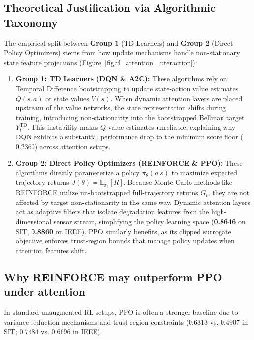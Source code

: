 \documentclass[sn-basic]{sn-jnl}%
\begin{document}
\subsection{Theoretical Justification via Algorithmic Taxonomy}
The empirical split between \textbf{Group 1} (TD Learners) and \textbf{Group 2} (Direct Policy Optimizers) stems from how update mechanisms handle non-stationary state feature projections (Figure~\ref{fig:rl_attention_interaction}):

\begin{enumerate}
	\item \textbf{Group 1: TD Learners (\textsc{DQN} \& \textsc{A2C}):} These algorithms rely on Temporal Difference bootstrapping to update state-action value estimates $Q(s,a)$ or state values $V(s)$. When dynamic attention layers are placed upstream of the value networks, the state representation shifts during training, introducing non-stationarity into the bootstrapped Bellman target $Y_t^{\text{TD}}$. This instability makes $Q$-value estimates unreliable, explaining why \textsc{DQN} exhibits a substantial performance drop to the minimum score floor ($0.2360$) across attention setups.
    
	\item \textbf{Group 2: Direct Policy Optimizers (\textsc{REINFORCE} \& \textsc{PPO}):} These algorithms directly parameterize a policy $\pi_\theta(a|s)$ to maximize expected trajectory returns $J(\theta) = \mathbb{E}_{\pi_\theta}[R]$. Because Monte Carlo methods like \textsc{REINFORCE} utilize un-bootstrapped full-trajectory returns $G_t$, they are not affected by target non-stationarity in the same way. Dynamic attention layers act as adaptive filters that isolate degradation features from the high-dimensional sensor stream, simplifying the policy learning space (\textbf{0.8646} on SIT, \textbf{0.8860} on IEEE). \textsc{PPO} similarly benefits, as its clipped surrogate objective enforces trust-region bounds that manage policy updates when attention features shift.
\end{enumerate}

\subsection{Why \textsc{REINFORCE} may outperform \textsc{PPO} under attention}
In standard unaugmented RL setups, \textsc{PPO} is often a stronger baseline due to variance-reduction mechanisms and trust-region constraints ($0.6313$ vs. $0.4907$ in SIT; $0.7484$ vs. $0.6696$ in IEEE). 
\end{document}
